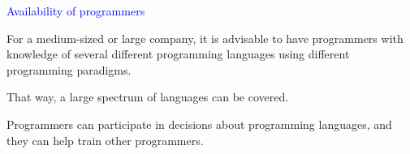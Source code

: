 \documentclass{slides}
\newcommand{\ti}[1]{\begin{center}\Large{\textcolor{blue}{#1}}\end{center}}
\begin{document}
\begin{slide}\ti{Availability of programmers}

For a medium-sized or large company, it is advisable to have
programmers with knowledge of several different programming languages
using different programming paradigms.

That way, a large spectrum of languages can be covered.

Programmers can participate in decisions about programming languages,
and they can help train other programmers.

\vfill\end{slide}



\end{document}
